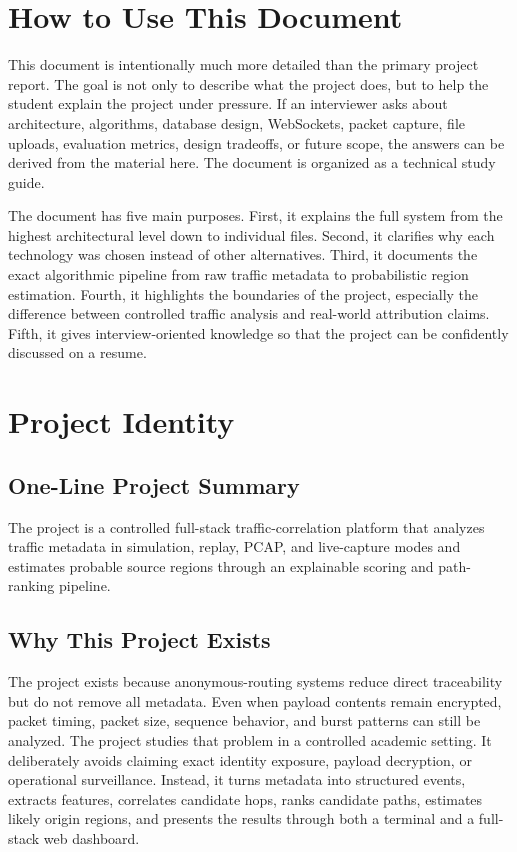 \documentclass[12pt,a4paper]{report}
\begin{document}
\chapter*{How to Use This Document}
This document is intentionally much more detailed than the primary project report. The goal is not only to describe what the project does, but to help the student explain the project under pressure. If an interviewer asks about architecture, algorithms, database design, WebSockets, packet capture, file uploads, evaluation metrics, design tradeoffs, or future scope, the answers can be derived from the material here. The document is organized as a technical study guide.

The document has five main purposes. First, it explains the full system from the highest architectural level down to individual files. Second, it clarifies why each technology was chosen instead of other alternatives. Third, it documents the exact algorithmic pipeline from raw traffic metadata to probabilistic region estimation. Fourth, it highlights the boundaries of the project, especially the difference between controlled traffic analysis and real-world attribution claims. Fifth, it gives interview-oriented knowledge so that the project can be confidently discussed on a resume.

\chapter{Project Identity}
\section{One-Line Project Summary}
The project is a controlled full-stack traffic-correlation platform that analyzes traffic metadata in simulation, replay, PCAP, and live-capture modes and estimates probable source regions through an explainable scoring and path-ranking pipeline.

\section{Why This Project Exists}
The project exists because anonymous-routing systems reduce direct traceability but do not remove all metadata. Even when payload contents remain encrypted, packet timing, packet size, sequence behavior, and burst patterns can still be analyzed. The project studies that problem in a controlled academic setting. It deliberately avoids claiming exact identity exposure, payload decryption, or operational surveillance. Instead, it turns metadata into structured events, extracts features, correlates candidate hops, ranks candidate paths, estimates likely origin regions, and presents the results through both a terminal and a full-stack web dashboard.
\end{document}
